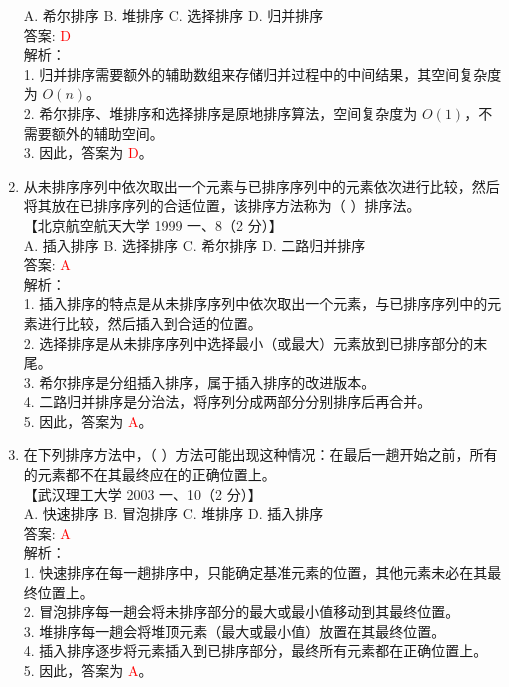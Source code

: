 \documentclass[lang=cn,newtx,10pt,scheme=chinese]{../../../elegantbook}
\begin{document}
\begin{enumerate}
    A. 希尔排序 \quad B. 堆排序 \quad C. 选择排序 \quad D. 归并排序 \\

    答案: \textcolor{red}{D} \\

    解析：\\
    1. 归并排序需要额外的辅助数组来存储归并过程中的中间结果，其空间复杂度为 $O(n)$。\\
    2. 希尔排序、堆排序和选择排序是原地排序算法，空间复杂度为 $O(1)$，不需要额外的辅助空间。\\
    3. 因此，答案为 \textcolor{red}{D}。\\

    \item 从未排序序列中依次取出一个元素与已排序序列中的元素依次进行比较，然后将其放在已排序序列的合适位置，该排序方法称为（ ）排序法。\\
    【北京航空航天大学 1999 一、8（2 分）】\\  

    A. 插入排序 \quad B. 选择排序 \quad C. 希尔排序 \quad D. 二路归并排序 \\

    答案: \textcolor{red}{A} \\

    解析：\\
    1. 插入排序的特点是从未排序序列中依次取出一个元素，与已排序序列中的元素进行比较，然后插入到合适的位置。\\
    2. 选择排序是从未排序序列中选择最小（或最大）元素放到已排序部分的末尾。\\
    3. 希尔排序是分组插入排序，属于插入排序的改进版本。\\
    4. 二路归并排序是分治法，将序列分成两部分分别排序后再合并。\\
    5. 因此，答案为 \textcolor{red}{A}。\\

\item 在下列排序方法中，（ ）方法可能出现这种情况：在最后一趟开始之前，所有的元素都不在其最终应在的正确位置上。\\
    【武汉理工大学 2003 一、10（2 分）】\\  

    A. 快速排序 \quad B. 冒泡排序 \quad C. 堆排序 \quad D. 插入排序 \\

    答案: \textcolor{red}{A} \\

    解析：\\
    1. 快速排序在每一趟排序中，只能确定基准元素的位置，其他元素未必在其最终位置上。\\
    2. 冒泡排序每一趟会将未排序部分的最大或最小值移动到其最终位置。\\
    3. 堆排序每一趟会将堆顶元素（最大或最小值）放置在其最终位置。\\
    4. 插入排序逐步将元素插入到已排序部分，最终所有元素都在正确位置上。\\
    5. 因此，答案为 \textcolor{red}{A}。\\


\end{enumerate}
\end{document}
